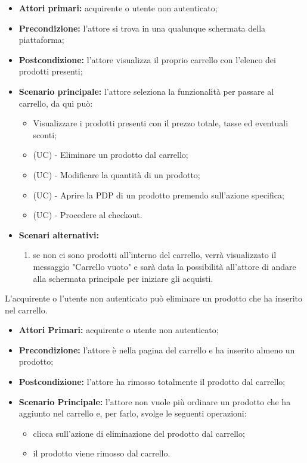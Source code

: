 \begin{itemize}
    \item \textbf{Attori primari:} acquirente o utente non autenticato;
    \item \textbf{Precondizione:} l'attore si trova in una qualunque schermata della piattaforma;
    \item \textbf{Postcondizione:} l'attore visualizza il proprio carrello con l'elenco dei prodotti presenti;
    \item \textbf{Scenario principale:} l'attore seleziona la funzionalità per passare al carrello, da qui può:
    \begin{itemize}
        \item Visualizzare i prodotti presenti con il prezzo totale, tasse ed eventuali sconti;
        \item (UC) - Eliminare un prodotto dal carrello;
        \item (UC) - Modificare la quantità di un prodotto;
        \item (UC) - Aprire la PDP di un prodotto premendo sull'azione specifica;
        \item (UC) - Procedere al checkout.
    \end{itemize}
    \item \textbf{Scenari alternativi:} 
    \begin{enumerate}[label=\lett]
        \item se non ci sono prodotti all'interno del carrello, verrà visualizzato il messaggio "Carrello vuoto" e sarà data la possibilità all'attore di andare alla schermata principale per iniziare gli acquisti.
    \end{enumerate}
\end{itemize}


L'acquirente o l'utente non autenticato può eliminare un prodotto che ha inserito nel carrello.
\begin{itemize}
    \item \textbf{Attori Primari:} acquirente o utente non autenticato;
    \item \textbf{Precondizione:} l'attore è nella pagina del carrello e ha inserito almeno un prodotto;
    \item \textbf{Postcondizione:} l'attore ha rimosso totalmente il prodotto dal carrello;
    \item \textbf{Scenario Principale:} l'attore non vuole più ordinare un prodotto che ha aggiunto nel carrello e, per farlo, svolge le seguenti operazioni:
    \begin{itemize}
        \item clicca sull'azione di eliminazione del prodotto dal carrello;
        \item il prodotto viene rimosso dal carrello.
    \end{itemize}
\end{itemize}

